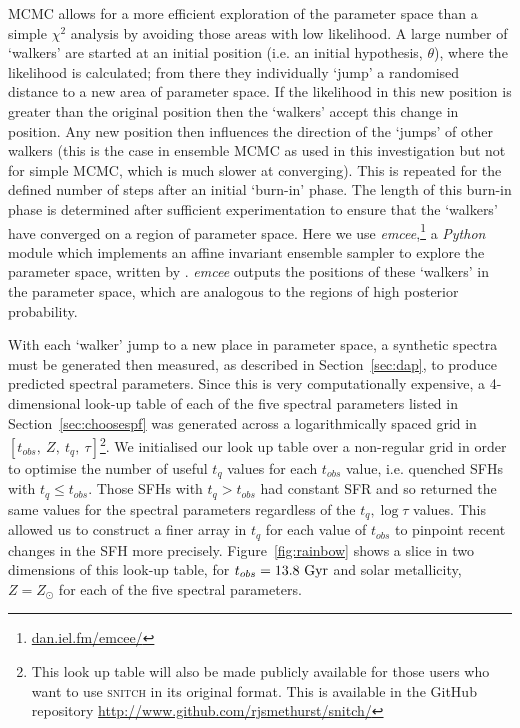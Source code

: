 \documentclass[useAMS,usenatbib]{mn2e}
\begin{document}
MCMC allows for a more efficient exploration of the parameter space than a simple $\chi^2$ analysis by avoiding those areas with low likelihood. A large number of `walkers' are started at an initial position (i.e. an initial hypothesis, $\theta$), where the likelihood is calculated; from there they individually `jump' a randomised distance to a new area of parameter space. If the likelihood in this new position is greater than the original position then the `walkers' accept this change in position. Any new position then influences the direction of the  `jumps' of other walkers (this is the case in ensemble MCMC as used in this investigation but not for simple MCMC, which is much slower at converging). This is repeated for the defined number of steps after an initial `burn-in' phase. The length of this burn-in phase is determined after sufficient experimentation to ensure that the `walkers' have converged on a region of parameter space. Here we use \emph{emcee},\footnote{\url{dan.iel.fm/emcee/}} a \emph{Python} module which implements an affine invariant ensemble sampler to explore the parameter space, written by \cite{emcee13}. \emph{emcee} outputs the positions of these `walkers' in the parameter space, which are analogous to the regions of high posterior probability. 



With each `walker' jump to a new place in parameter space, a synthetic spectra must be generated then measured, as described in Section~\ref{sec:dap}, to produce predicted spectral parameters. Since this is very computationally expensive, a 4-dimensional look-up table of each of the five spectral parameters listed in Section~\ref{sec:choosespf} was generated across a logarithmically spaced grid in $[t_{obs},~Z,~t_q,~\tau]$\footnote{This look up table will also be made publicly available for those users who want to use \textsc{snitch} in its original format. This is available in the GitHub repository \url{http://www.github.com/rjsmethurst/snitch/}}. We initialised our look up table over a non-regular grid in order to optimise the number of useful $t_q$ values for each $t_{obs}$ value, i.e. quenched SFHs with $t_q \leq t_{obs}$. Those SFHs with $t_q > t_{obs}$ had constant SFR and so returned the same values for the spectral parameters regardless of the $t_q, \log\tau$ values. This allowed us to construct a finer array in $t_q$ for each value of $t_{obs}$ to pinpoint recent changes in the SFH more precisely. Figure~\ref{fig:rainbow} shows a slice in two dimensions of this look-up table, for $t_{obs} = 13.8~\rm{Gyr}$ and solar metallicity, $Z=Z_{\odot}$ for each of the five spectral parameters.
\end{document}
